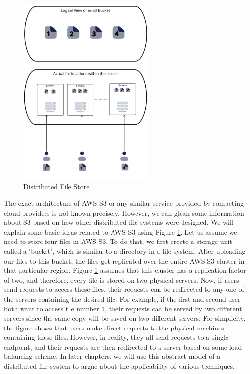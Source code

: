 \begin{figure}[ht]
    \centering
    \includegraphics[width=0.6\textwidth]{figures/distributedCloudStorage.png}
    \caption{Distributed File Store}
    \label{fig:distFileStore}
\end{figure}

\medskip
The exact architecture of AWS S3 or any similar service provided by
competing cloud providers is not known precisely. However, we can glean some information
about S3 based on
how other distributed file systems were designed. We will explain some basic ideas
related to AWS S3 using Figure-\ref{fig:distFileStore}. Let us assume we need to
store four files in AWS S3. To do that, we first create a storage unit
called a `bucket', which is similar to a directory in a file system. After
uploading our files to this bucket, the files get replicated over the entire AWS S3 cluster in
that particular region. Figure-\ref{fig:distFileStore} assumes that this cluster
has a replication factor of two, and therefore, every file is stored on two
physical servers. Now, if users send requests to access these files, their
requests can be redirected to any one of the servers containing the desired file. For
example, if the first and second user both want to access file number 1, their
requests can be served by two different servers since the same copy will be
saved on two different servers. For simplicity, the figure shows that users make
direct requests to the physical machines containing these files. However, in
reality, they all send requests to a single endpoint, and their requests are then
redirected to a server based on some load-balancing scheme. In later chapters,
we will use this abstract model of a distributed file system to argue about the
applicability of various techniques.

